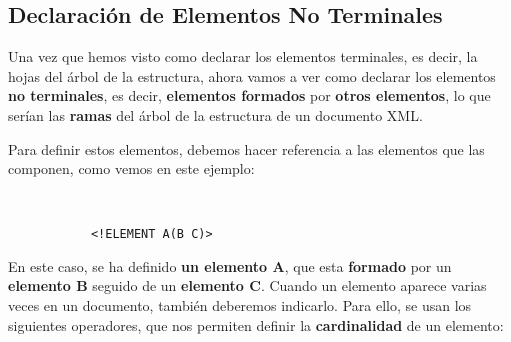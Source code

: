 \subsection{Declaración de Elementos No Terminales}
Una vez que hemos visto como declarar los elementos terminales, es decir, la hojas del árbol de la estructura, ahora vamos a ver como declarar los elementos \textbf{no terminales}, es decir, \textbf{elementos formados} por \textbf{otros elementos}, lo que serían las \textbf{ramas} del árbol de la estructura de un documento XML.

Para definir estos elementos, debemos hacer referencia a las elementos que las componen, como vemos en este ejemplo:

\begin{figure}[H]
    \begin{tcolorbox}[sharp corners, colback=yellow!30, colframe=white!20]
        \scriptsize
        \begin{verbatim}


      <!ELEMENT A(B C)>
        \end{verbatim}
    \end{tcolorbox}
\end{figure}

En este caso, se ha definido \textbf{un elemento A}, que esta \textbf{formado} por un \textbf{elemento B} seguido de un \textbf{elemento C}. Cuando un elemento aparece varias veces en un documento, también deberemos indicarlo. Para ello, se usan los siguientes operadores, que nos permiten definir la \textbf{cardinalidad} de un elemento:

